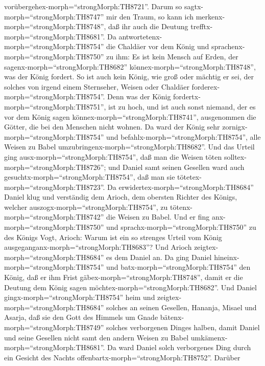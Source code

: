 vorübergehex-morph=``strongMorph:TH8721''. Darum so
sagtx-morph=``strongMorph:TH8747'' mir den Traum, so kann ich
merkenx-morph=``strongMorph:TH8748'', daß ihr auch die Deutung
trefftx-morph=``strongMorph:TH8681''.  Da
antwortetenx-morph=``strongMorph:TH8754'' die Chaldäer vor dem König und
sprachenx-morph=``strongMorph:TH8750'' zu ihm: Es ist kein Mensch auf
Erden, der sagenx-morph=``strongMorph:TH8682''
könnex-morph=``strongMorph:TH8748'', was der König fordert. So ist auch
kein König, wie groß oder mächtig er sei, der solches von irgend einem
Sternseher, Weisen oder Chaldäer forderex-morph=``strongMorph:TH8754''.
 Denn was der König fordertx-morph=``strongMorph:TH8751'',
ist zu hoch, und ist auch sonst niemand, der es vor dem König sagen
könnex-morph=``strongMorph:TH8741'', ausgenommen die Götter, die bei den
Menschen nicht wohnen.  Da ward der König sehr
zornigx-morph=``strongMorph:TH8754'' und
befahlx-morph=``strongMorph:TH8754'', alle Weisen zu Babel
umzubringenx-morph=``strongMorph:TH8682''.  Und das Urteil
ging ausx-morph=``strongMorph:TH8754'', daß man die Weisen töten
solltex-morph=``strongMorph:TH8726''; und Daniel samt seinen Gesellen
ward auch gesuchtx-morph=``strongMorph:TH8754'', daß man sie
tötetex-morph=``strongMorph:TH8723''.  Da
erwidertex-morph=``strongMorph:TH8684'' Daniel klug und verständig dem
Arioch, dem obersten Richter des Königs, welcher
auszogx-morph=``strongMorph:TH8754'', zu
tötenx-morph=``strongMorph:TH8742'' die Weisen zu Babel. 
Und er fing anx-morph=``strongMorph:TH8750'' und
sprachx-morph=``strongMorph:TH8750'' zu des Königs Vogt, Arioch: Warum
ist ein so strenges Urteil vom König
ausgeganganx-morph=``strongMorph:TH8683''? Und Arioch
zeigtex-morph=``strongMorph:TH8684'' es dem Daniel an.  Da
ging Daniel hineinx-morph=``strongMorph:TH8754'' und
batx-morph=``strongMorph:TH8754'' den König, daß er ihm Frist
gäbex-morph=``strongMorph:TH8748'', damit er die Deutung dem König sagen
möchtex-morph=``strongMorph:TH8682''.  Und Daniel
gingx-morph=``strongMorph:TH8754'' heim und
zeigtex-morph=``strongMorph:TH8684'' solches an seinen Gesellen,
Hananja, Misael und Asarja,  daß sie den Gott des Himmels
um Gnade bätenx-morph=``strongMorph:TH8749'' solches verborgenen Dinges
halben, damit Daniel und seine Gesellen nicht samt den andern Weisen zu
Babel umkämenx-morph=``strongMorph:TH8681''.  Da ward
Daniel solch verborgenes Ding durch ein Gesicht des Nachts
offenbartx-morph=``strongMorph:TH8752''.  Darüber
